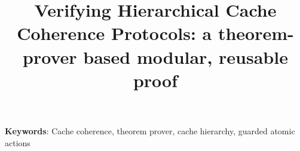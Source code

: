 
\title{Verifying Hierarchical Cache Coherence Protocols: a theorem-prover based modular, reusable proof}




\author{
}

\date{}

\maketitle %


\begin{abstract}
%
\end{abstract}


\centerline{\footnotesize {\bf Keywords}: Cache coherence, theorem prover, cache hierarchy, guarded atomic actions}



